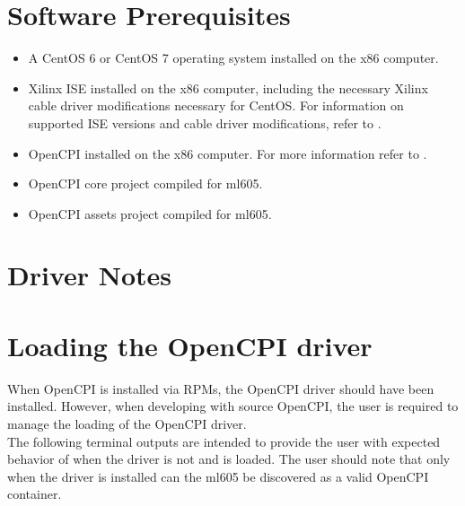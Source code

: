 \documentclass{article}
\begin{document}
\section{Software Prerequisites}
\begin{itemize}
\item A CentOS 6 or CentOS 7 operating system installed on the x86 computer.
\item Xilinx ISE installed on the x86 computer, including the necessary Xilinx cable driver modifications necessary for CentOS. For information on supported ISE versions and cable driver modifications, refer to \cite{fpga_vendor_tool_guide}.
\item OpenCPI installed on the x86 computer. For more information refer to \cite{installation_guide}.
\item OpenCPI core project compiled for ml605.
\item OpenCPI assets project compiled for ml605.
\end{itemize}



\section{Driver Notes}


\section{Loading the OpenCPI driver}
When OpenCPI is installed via RPMs, the OpenCPI driver should have been installed. However, when developing with source OpenCPI, the user is required to manage the loading of the OpenCPI driver. \\
The following terminal outputs are intended to provide the user with expected behavior of when the driver is not and is loaded. The user should note that only when the driver is installed can the ml605 be discovered as a valid OpenCPI container.
\end{document}
